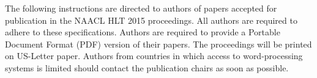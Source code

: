 The following instructions are directed to authors of papers accepted
for publication in the NAACL HLT 2015 proceedings.  All authors are required
to adhere to these specifications. Authors are required to provide 
a Portable Document Format (PDF) version of
their papers.  The proceedings will be printed on US-Letter paper.
Authors from countries in which access to word-processing systems is
limited should contact the publication chairs as soon as possible.

